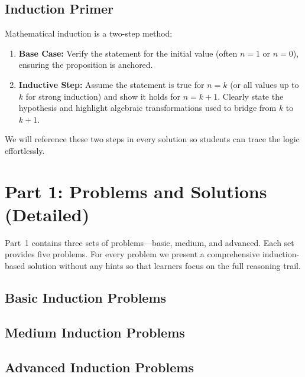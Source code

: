 \documentclass[12pt]{article}
\begin{document}
\subsection{Induction Primer}
Mathematical induction is a two-step method:
\begin{enumerate}[leftmargin=*]
  \item \textbf{Base Case:} Verify the statement for the initial value (often $n=1$ or $n=0$), ensuring the proposition is anchored.
  \item \textbf{Inductive Step:} Assume the statement is true for $n=k$ (or all values up to $k$ for strong induction) and show it holds for $n=k+1$. Clearly state the hypothesis and highlight algebraic transformations used to bridge from $k$ to $k+1$.
\end{enumerate}
We will reference these two steps in every solution so students can trace the logic effortlessly.

\section{Part 1: Problems and Solutions (Detailed)}
Part~1 contains three sets of problems---basic, medium, and advanced. Each set provides five problems. For every problem we present a comprehensive induction-based solution without any hints so that learners focus on the full reasoning trail.

\subsection{Basic Induction Problems}



\subsection{Medium Induction Problems}









\subsection{Advanced Induction Problems}

\end{document}
